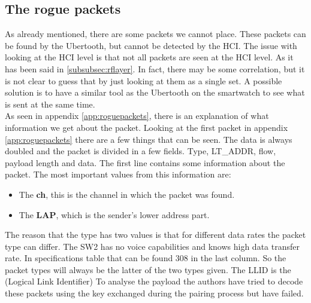 \subsection{The rogue packets}
As already mentioned, there are some packets we cannot place. These packets can be found by the Ubertooth, but cannot be detected by the HCI. The issue with looking at the HCI level is that not all packets are seen at the HCI level. As it has been said in \ref{subsubsec:rflayer}. In fact, there may be some correlation, but it is not clear to guess that by just looking at them as a single set. A possible solution is to have a similar tool as the Ubertooth on the smartwatch to see what is sent at the same time. \\
As seen in appendix \ref{app:roguepackets}, there is an explanation of what information we get about the packet.
Looking at the first packet in appendix \ref{app:roguepackets} there are a few things that can be seen. The data is always doubled and the packet is divided in a few fields. Type, LT\_ADDR, flow, payload length and data. The first line contains some information about the packet. The most important values from this information are:
\begin{itemize} 
\item The \textbf{ch}, this is the channel in which the packet was found.
\item The \textbf{LAP}, which is the sender's lower address part.
\end{itemize}
The reason that the type has two values is that for different data rates the packet type can differ. The SW2 has no voice capabilities and knows high data transfer rate. In specifications table that can be found 308 in the last column. So the packet types will always be the latter of the two types given.
The LLID is the (Logical Link Identifier)
To analyse the payload the authors have tried to decode these packets using the key exchanged during the pairing process but have failed.
